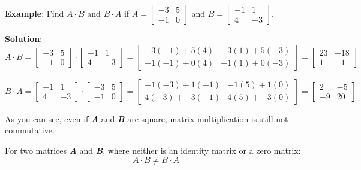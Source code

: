 \textbf{Example}: Find $\mathbf{\mathit{A}} \cdot \mathbf{\mathit{B}}$ and
$\mathbf{\mathit{B}} \cdot \mathbf{\mathit{A}}$ if $\mathbf{\mathit{A}} =
\begin{bmatrix}
-3 & 5\\
-1 & 0
\end{bmatrix}$ and $\mathbf{\mathit{B}} = \begin{bmatrix}
-1 & 1\\
4 & -3
\end{bmatrix}$.

\textbf{Solution}: $$\mathbf{\mathit{A}} \cdot \mathbf{\mathit{B}} =
\begin{bmatrix}
-3 & 5\\
-1 & 0
\end{bmatrix} \cdot \begin{bmatrix}
-1 & 1\\
4 & -3
\end{bmatrix} = \begin{bmatrix}
-3(-1) + 5(4) & -3(1) + 5(-3)\\
-1(-1) + 0(4) & -1(1) + 0(-3)
\end{bmatrix} = \begin{bmatrix}
23 & -18\\
1 & -1
\end{bmatrix}$$

$$\mathbf{\mathit{B}} \cdot \mathbf{\mathit{A}} = \begin{bmatrix}
-1 & 1\\
4 & -3
\end{bmatrix} \cdot \begin{bmatrix}
-3 & 5\\
-1 & 0
\end{bmatrix} = \begin{bmatrix}
-1(-3) + 1(-1) & -1(5) + 1(0)\\
4(-3) + -3(-1) & 4(5) + -3(0)
\end{bmatrix} = \begin{bmatrix}
2 & -5\\
-9 & 20
\end{bmatrix}$$

As you can see, even if \textbf{\textit{A}} and \textbf{\textit{B}} are square,
matrix multiplication is still not commutative.

\begin{mdframed}[style = important, frametitle = {Non-Commutation of Matrix Multiplication}]
For two matrices \textbf{\textit{A}} and \textbf{\textit{B}}, where neither is
an identity matrix or a zero matrix:
$$\mathbf{\mathit{A}} \cdot \mathbf{\mathit{B}} \neq \mathbf{\mathit{B}}
\cdot \mathbf{\mathit{A}}$$
\end{mdframed}

